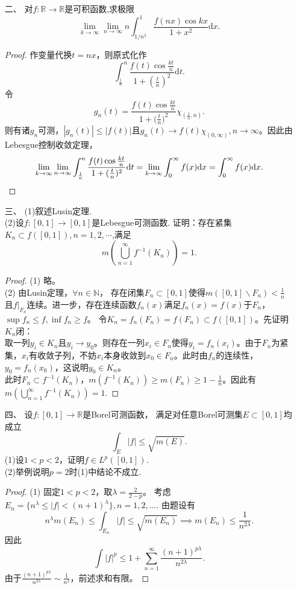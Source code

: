 \begin{itemize}
\begin{proof}
    取$x_0$使得$\bar{F}_n(x_0) > c$，
    则存在$r_0 \in \big(0,\frac{1}{n}\big)$使得$F_{r_0}(x_0) > c$。
    由连续性，存在$\delta > 0$
    使得$\forall x \in (x_0-\delta ,x_0+\delta)$，$F_{r_0}(x) > c$。
    进一步，$\forall x \in (x_0-\delta ,x_0+\delta)$有$\bar{F}_n(x) > c$。
\end{proof}
\item[二、]
对$f\colon\mathbb{R} \to \mathbb{R}$是可积函数,求极限
$$\lim_{k\rightarrow \infty}\lim_{n\rightarrow \infty}
n\int_{1/n^2}^1{\frac{f(nx) \cos kx}{1+x^2}\text{d}x}.$$
\begin{proof}
    作变量代换$t=nx$，则原式化作
    $$
        \int_\frac{1}{n}^n \frac{f(t)\cos \frac{kt}{n}}{1+(\frac{t}{n})^2} \mathrm{d}t.
    $$
    令
    $$g_n(t)=\frac{f(t)\cos \frac{kt}{n}}{1+\big(\frac{t}{n}\big)^2} \chi_{(\frac{1}{n},n)}.$$
    则有诸$g_n$可测，$|g_n(t)| \le |f(t)|$且$g_n(t) \to f(t)\chi_{(0,\infty)},n\to\infty$。因此由Lebesgue控制收敛定理，
    $$
        \lim_{k \to \infty}\lim_{n\to \infty } \int_\frac{1}{n}^n \frac{f(t)\cos \frac{kt}{n}}{1+(\frac{t}{n})^2} \mathrm{d}t 
        = \lim_{k \to \infty}\int_0^\infty f(x) \mathrm{d}x 
        = \int_0^\infty f(x) \mathrm{d}x.\qedhere
    $$
\end{proof}
\item[三、]
(1)叙述Lusin定理.\\
(2)设$f\colon[0,1]\rightarrow [0,1]$是Lebesgue可测函数.
证明：存在紧集$K_n \subset f([0,1]),n=1,2,\cdots$,满足
\[m(\bigcup_{n=1}^{\infty}f^{-1}(K_n))=1.\]
\begin{proof}
    (1) 略。\\
    (2) 由Lusin定理，$\forall n \in \mathbb{N}$，
    存在闭集$F_n \subset [0,1]$使得$m([0,1]\backslash F_n) < \frac{1}{n}$
    且$f|_{F_n}$连续。进一步，存在连续函数$f_n(x)$满足$f_n(x)=f(x)$于$F_n$，
    $\sup f_n \le f,\inf f_n \ge f$。
    令$K_n=f_n(F_n)=f(F_n)\subset f([0,1])$。先证明$K_n$闭：\\
    取一列$y_i \in K_n$且$y_i \to y_0$。则存在一列$x_i \in F_n$使得$y_i = f_n(x_i)$。由于$F_n$为紧集，$x_i$有收敛子列，不妨$x_i$本身收敛到$x_0 \in F_n$。此时由$f_n$的连续性，$y_0 = f_n(x_0)$，这说明$y_0 \in K_n$。\\
    此时$F_n \subset f^{-1}(K_n)$，$m(f^{-1}(K_n)) \ge m(F_n) \ge 1-\frac{1}{n}$。因此有$m(\bigcup_{n=1}^{\infty}f^{-1}(K_n))=1.$
\end{proof}

\item[四、]设$f\colon[0,1]\rightarrow \mathbb{R}$是Borel可测函数，
满足对任意Borel可测集$E\subset[0,1]$均成立
\[\int_{E}|f|\leq\sqrt{m(E)}.\]
(1)设$1<p<2$，证明$f\in L^{p}([0,1])$.\\
(2)举例说明$p=2$时(1)中结论不成立.
\begin{proof}
    (1) 固定$1 < p <2$，取$\lambda = \frac{2}{2-p}$。
    考虑$E_n = \{ n^\lambda \leq |f| < (n+1)^\lambda \},n=1,2,\ldots$.
    由题设有
    \[n^\lambda m(E_n) \leq \int_{E_n} |f| 
    \leq \sqrt{m(E_n)} \implies m(E_n)\leq \frac{1}{n^{2\lambda}}.\]
    因此
    \[\int |f|^p \leq 1+\sum\limits_{n=1}^\infty \frac{(n+1)^{p\lambda}}{n^{2\lambda}}.\]
    由于$\frac{(n+1)^{p\lambda}}{n^{2\lambda}}\sim \frac{1}{n^2}$，前述求和有限。


\end{proof}
\end{itemize}
